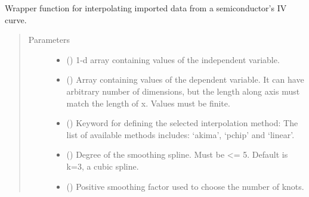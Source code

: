 \documentclass[letterpaper,10pt,english,openany, oneside]{sphinxmanual}
\begin{document}
\begin{fulllineitems}
\label{\detokenize{index:fompy.plots.interpol}}
Wrapper function for interpolating imported data from a semiconductor’s IV curve.
\begin{quote}\begin{description}
\item[{Parameters}] \leavevmode\begin{itemize}
\item {} 
 (\sphinxstyleliteralemphasis{\sphinxupquote{, }}\sphinxstyleliteralemphasis{\sphinxupquote{ (}}\sphinxstyleliteralemphasis{\sphinxupquote{,}}\sphinxstyleliteralemphasis{\sphinxupquote{)}}) \textendash{} 1-d array containing values of the independent variable.

\item {} 
 () \textendash{} Array containing values of the dependent variable.
It can have arbitrary number of dimensions, but the length along axis
must match the length of x. Values must be finite.

\item {} 
 () \textendash{} Keyword for defining the selected interpolation method: The list of available methods includes:
‘akima’, ‘pchip’ and ‘linear’.

\item {} 
 () \textendash{} Degree of the smoothing spline. Must be \textless{}= 5.
Default is k=3, a cubic spline.

\item {} 
 () \textendash{} Positive smoothing factor used to choose the number of knots.

\end{itemize}

\end{description}\end{quote}

\end{fulllineitems}
\end{document}
